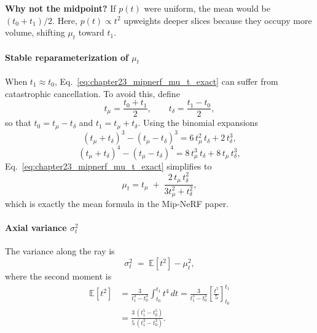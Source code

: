 \begin{enrichment}
\begin{enrichment}
    \noindent
    \textbf{Why not the midpoint?}  
    If $p(t)$ were uniform, the mean would be $(t_0 + t_1)/2$.  
    Here, $p(t) \propto t^2$ upweights deeper slices because they occupy more volume, shifting $\mu_t$ toward $t_1$.
    
    \paragraph{Stable reparameterization of $\mu_t$}  
    When $t_1 \approx t_0$, Eq.~\ref{eq:chapter23_mipnerf_mu_t_exact} can suffer from catastrophic cancellation.  
    To avoid this, define
    \[
    t_\mu = \frac{t_0 + t_1}{2}, 
    \qquad
    t_\delta = \frac{t_1 - t_0}{2},
    \]
    so that $t_0 = t_\mu - t_\delta$ and $t_1 = t_\mu + t_\delta$.  
    Using the binomial expansions
    \[
    (t_\mu + t_\delta)^3 - (t_\mu - t_\delta)^3 = 6\,t_\mu^2\,t_\delta + 2\,t_\delta^3,
    \]
    \[
    (t_\mu + t_\delta)^4 - (t_\mu - t_\delta)^4 = 8\,t_\mu^3\,t_\delta + 8\,t_\mu\,t_\delta^3,
    \]
    Eq.~\ref{eq:chapter23_mipnerf_mu_t_exact} simplifies to
    \begin{equation}
        \mu_t
        = t_\mu \;+\; \frac{2\,t_\mu\,t_\delta^2}{3t_\mu^2 + t_\delta^2},
        \label{eq:chapter23_mipnerf_mu_t_stable}
    \end{equation}
    which is exactly the mean formula in the Mip-NeRF paper.
    
    \paragraph{Axial variance $\sigma_t^2$}  
    The variance along the ray is
    \begin{equation}
        \sigma_t^2
        \;=\;
        \mathbb{E}[t^2] - \mu_t^2,
        \label{eq:chapter23_mipnerf_axial_variance}
    \end{equation}
    where the second moment is
    \begin{align}
        \mathbb{E}[t^2]
        &= \frac{3}{t_1^3 - t_0^3} \int_{t_0}^{t_1} t^4 \, dt
        = \frac{3}{t_1^3 - t_0^3} \left[ \frac{t^5}{5} \right]_{t_0}^{t_1} \\
        &= \frac{3\,(t_1^5 - t_0^5)}{5\,(t_1^3 - t_0^3)}.
        \label{eq:chapter23_mipnerf_second_moment_t}
    \end{align}
    

\end{enrichment}
\end{enrichment}
